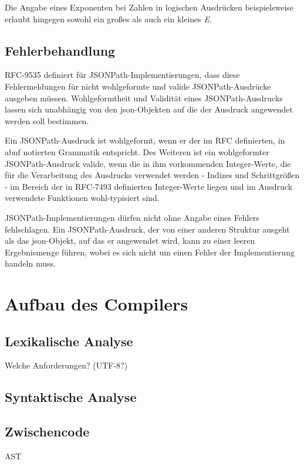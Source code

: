 \documentclass[oneside]{ausarbeitung}
\begin{document}
	Die Angabe eines Exponenten bei Zahlen in logischen Ausdrücken beispielsweise erlaubt hingegen sowohl ein großes als auch ein kleines \textit{E}. 
	
	
	
	\subsection{Fehlerbehandlung}
	
	RFC-9535 definiert für JSONPath-Implementierungen, dass diese Fehlermeldungen für nicht wohlgeformte und valide JSONPath-Ausdrücke ausgeben müssen. Wohlgeformtheit und Validität eines JSONPath-Ausdrucks lassen sich unabhängig von den \ac{json}-Objekten auf die der Ausdruck angewendet werden soll bestimmen. 
	
	Ein JSONPath-Ausdruck ist wohlgeformt, wenn er der im RFC definierten, in \ac{abnf} notierten Grammatik entspricht. Des Weiteren ist ein wohlgeformter JSONPath-Ausdruck valide, wenn die in ihm vorkommenden Integer-Werte, die für die Verarbeitung des Ausdrucks verwendet werden - Indizes und Schrittgrößen - im Bereich der in RFC-7493 definierten Integer-Werte liegen und im Ausdruck verwendete Funktionen wohl-typisiert sind. 
	
	JSONPath-Implementierungen dürfen nicht ohne Angabe eines Fehlers fehlschlagen. Ein JSONPath-Ausdruck, der von einer anderen Struktur ausgeht als das \ac{json}-Objekt, auf das er angewendet wird, kann zu einer leeren Ergebnismenge führen, wobei es sich nicht um einen Fehler der Implementierung handeln muss.
	
	
	
	
	
	
	
	\section{Aufbau des Compilers}
	
	\subsection{Lexikalische Analyse}
	Welche Anforderungen? (UTF-8?)
	
	\subsection{Syntaktische Analyse}
	
	\subsection{Zwischencode}
	AST
	
\end{document}
